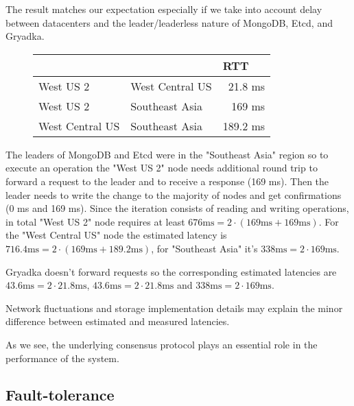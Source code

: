 \documentclass[a4paper,USenglish]{lipics-v2018}
\theoremstyle{definition}
\begin{document}
    The result matches our expectation especially if we take into account delay between datacenters and the leader/leaderless nature of MongoDB, Etcd, and Gryadka.
    
    \begin{figure}[!h]
        \centering
        \begin{tabular}{llr|}
            \cline{3-3}
            & & \multicolumn{1}{|l|}{RTT} \\
            \hline
            \multicolumn{1}{|l|}{West US 2} & \multicolumn{1}{|l|}{West Central US} & 21.8 ms\\
            \hline
            \multicolumn{1}{|l|}{West US 2} & \multicolumn{1}{|l|}{Southeast Asia} & 169 ms\\
            \hline
            \multicolumn{1}{|l|}{West Central US} & \multicolumn{1}{|l|}{Southeast Asia} & 189.2 ms\\
            \hline
        \end{tabular}
    \end{figure}
    
    The leaders of MongoDB and Etcd were in the "Southeast Asia" region so to execute an operation the "West US 2" node needs additional round trip to forward a request to the leader and to receive a response (169 ms). Then the leader needs to write the change to the majority of nodes and get confirmations (0 ms and 169 ms). Since the iteration consists of reading and writing operations, in total "West US 2" node requires at least $676 \mbox{ms} = 2 \cdot (169 \mbox{ms} + 169 \mbox{ms})$. For the "West Central US" node the estimated latency is $716.4 \mbox{ms} = 2 \cdot (169 \mbox{ms} + 189.2 \mbox{ms})$, for "Southeast Asia" it's $338 \mbox{ms} = 2 \cdot 169 \mbox{ms}$.
    
    Gryadka doesn't forward requests so the corresponding estimated latencies are $43.6 \mbox{ms} = 2 \cdot 21.8 \mbox{ms}$, $43.6 \mbox{ms} = 2 \cdot 21.8 \mbox{ms}$ and $338 \mbox{ms} = 2 \cdot 169 \mbox{ms}$.
    
    Network fluctuations and storage implementation details may explain the minor difference between estimated and measured latencies.
    
    As we see, the underlying consensus protocol plays an essential role in the performance of the system.

\subsection{Fault-tolerance}
\end{document}

